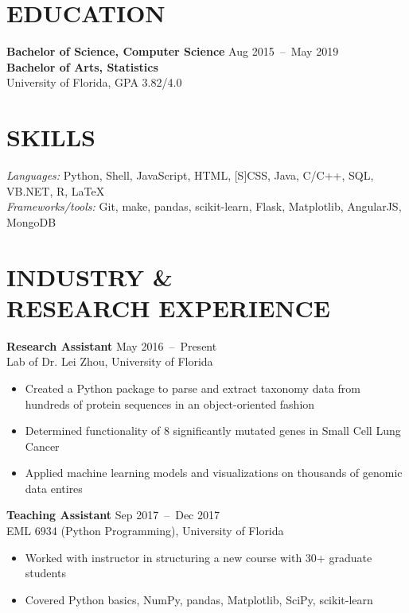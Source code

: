 \documentclass[line,resmargin]{res}
\begin{document}
\address{}
\address{}

\begin{resume}

\section{EDUCATION}
    \textbf{Bachelor of Science, Computer Science}    \hfill Aug 2015~--~May 2019 \\
    \textbf{Bachelor of Arts, Statistics} \\
    University of Florida, GPA 3.82/4.0

\section{SKILLS}
    {\sl Languages:} Python, Shell, JavaScript, HTML, [S]CSS, Java, C/C++, SQL, VB.NET, R, LaTeX \\
    {\sl Frameworks/tools:} Git, make, pandas, scikit-learn, Flask, Matplotlib, AngularJS, MongoDB

\section{INDUSTRY \& \\ RESEARCH EXPERIENCE}
    \textbf{Research Assistant}    \hfill May 2016~--~Present \\
    Lab of Dr. Lei Zhou, University of Florida
    \begin{itemize}  \itemsep -2pt
        \item Created a Python package to parse and extract taxonomy data from hundreds of protein sequences in an object-oriented fashion
        \item Determined functionality of 8 significantly mutated genes in Small Cell Lung Cancer
        \item Applied machine learning models and visualizations on thousands of genomic data entires
    \end{itemize}

    \textbf{Teaching Assistant}    \hfill Sep 2017~--~Dec 2017 \\
    EML 6934 (Python Programming), University of Florida
    \begin{itemize}  \itemsep -2pt
        \item Worked with instructor in structuring a new course with 30+ graduate students
        \item Covered Python basics, NumPy, pandas, Matplotlib, SciPy, scikit-learn
    \end{itemize}


\end{resume}
\end{document}
